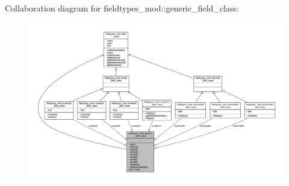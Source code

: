 Collaboration diagram for fieldtypes\+\_\+mod\+:\+:generic\+\_\+field\+\_\+class\+:\nopagebreak
\begin{figure}[H]
\begin{center}
\leavevmode
\includegraphics[width=350pt]{structfieldtypes__mod_1_1generic__field__class__coll__graph}
\end{center}
\end{figure}
